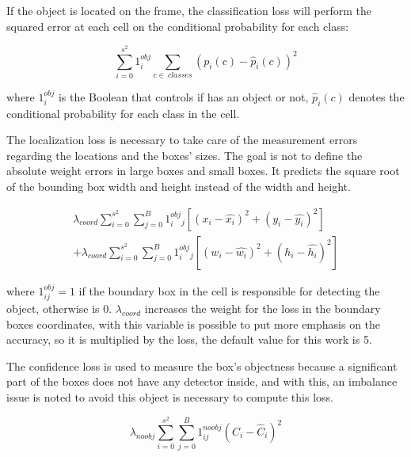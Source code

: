 If the object is located on the frame, the classification loss will perform the squared error at each cell on the conditional probability for each class: 

\begin{equation}
\label{eq:classification_loss}
    \sum_{i=0}^{s^2}1^{obj}_i \sum_{c\in~classes} \left ( p_i\left ( c \right )-\hat{p}_i\left ( c \right )\right )^2
\end{equation}

where $1^{obj}_i$ is the Boolean that controls if has an object or not, $\hat{p}_i\left ( c \right )$ denotes the conditional probability for each class in the cell.

The localization loss is necessary to take care of the measurement errors regarding the locations and the boxes' sizes. The goal is not to define the absolute weight errors in large boxes and small boxes. It predicts the square root of the bounding box width and height instead of the width and height. 

\begin{equation}
\label{eq:localization_loss}
\begin{aligned}
    \lambda_{coord}\sum_{i=0}^{s^2}\sum_{j=0}^{B}1^{obj}_i_j\left [ \left ( x_i - \hat{x_i} \right )^2  + (y_i-\hat{y_i})^2 \right ] \\ 
    + \lambda_{coord}\sum_{i=0}^{s^2}\sum_{j=0}^{B}1^{obj}_i_j\left [ \left ( w_i - \hat{w_i} \right )^2  + (h_i-\hat{h_i})^2 \right ] 
    \end{aligned}
\end{equation}

where $1_{ij}^{obj} = 1$ if the boundary box in the cell is responsible for detecting the object, otherwise is 0. $\lambda_{coord}$ increases the weight for the loss in the boundary boxes coordinates, with this variable is possible to put more emphasis on the accuracy, so it is multiplied by the loss, the default value for this work is 5. 

The confidence loss is used to measure the box's objectness because a significant part of the boxes does not have any detector inside, and with this, an imbalance issue is noted to avoid this object is necessary to compute this loss. 

\begin{equation}
    \label{eq:confidence_loss}
    \lambda_{noobj}\sum_{i=0}^{s^2}\sum_{j=0}^{B}1^{noobj}_{ij}\left ( C_i - \hat{C}_i \right )^2
\end{equation}

